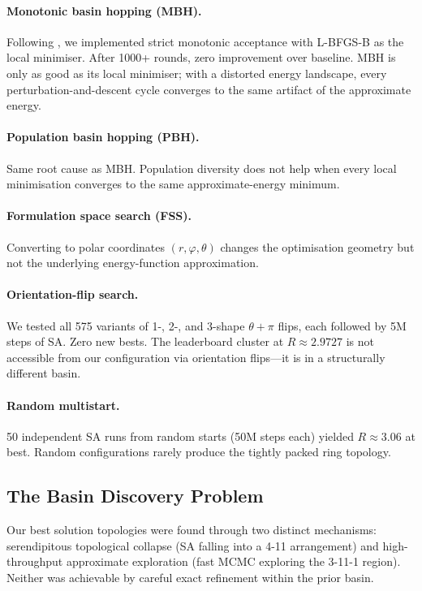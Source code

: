 \documentclass[11pt]{article}
\begin{document}
\paragraph{Monotonic basin hopping (MBH).}
Following \citet{grosso2010}, we implemented strict monotonic acceptance with L-BFGS-B as the local minimiser.
After 1000+ rounds, zero improvement over baseline.
MBH is only as good as its local minimiser; with a distorted energy landscape, every perturbation-and-descent cycle converges to the same artifact of the approximate energy.

\paragraph{Population basin hopping (PBH).}
Same root cause as MBH. Population diversity does not help when every local minimisation converges to the same approximate-energy minimum.

\paragraph{Formulation space search (FSS).}
Converting to polar coordinates $(r, \varphi, \theta)$ changes the optimisation geometry but not the underlying energy-function approximation.

\paragraph{Orientation-flip search.}
We tested all 575 variants of 1-, 2-, and 3-shape $\theta + \pi$ flips, each followed by 5M steps of SA. Zero new bests. The leaderboard cluster at $R \approx 2.9727$ is not accessible from our configuration via orientation flips---it is in a structurally different basin.

\paragraph{Random multistart.}
50 independent SA runs from random starts (50M steps each) yielded $R \approx 3.06$ at best. Random configurations rarely produce the tightly packed ring topology.

\subsection{The Basin Discovery Problem}
\label{sec:landscape}

Our best solution topologies were found through two distinct mechanisms: serendipitous topological collapse (SA falling into a 4-11 arrangement) and high-throughput approximate exploration (fast MCMC exploring the 3-11-1 region). Neither was achievable by careful exact refinement within the prior basin.
\end{document}

